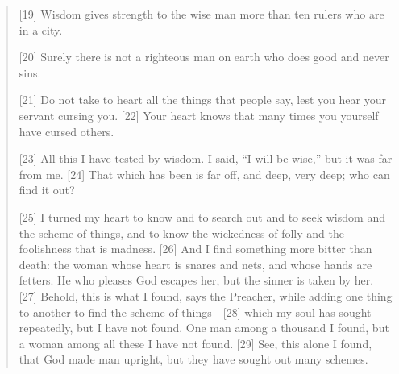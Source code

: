 \begin{quote}
    [19] Wisdom gives strength to the wise man more than ten rulers who are
    in a city.

    [20] Surely there is not a righteous man on earth who does good and never
    sins.

    [21] Do not take to heart all the things that people say, lest you hear
    your servant cursing you.  [22] Your heart knows that many times you
    yourself have cursed others.

    [23] All this I have tested by wisdom.  I said, “I will be wise,” but it
    was far from me.  [24] That which has been is far off, and deep, very
    deep; who can find it out?

    [25] I turned my heart to know and to search out and to seek wisdom and the
    scheme of things, and to know the wickedness of folly and the foolishness
    that is madness.  [26] And I find something more bitter than death: the
    woman whose heart is snares and nets, and whose hands are fetters.  He who
    pleases God escapes her, but the sinner is taken by her.  [27] Behold, this
    is what I found, says the Preacher, while adding one thing to another to
    find the scheme of things—[28] which my soul has sought repeatedly, but I
    have not found.  One man among a thousand I found, but a woman among all
    these I have not found.  [29] See, this alone I found, that God made man
    upright, but they have sought out many schemes.
  \end{quote}
